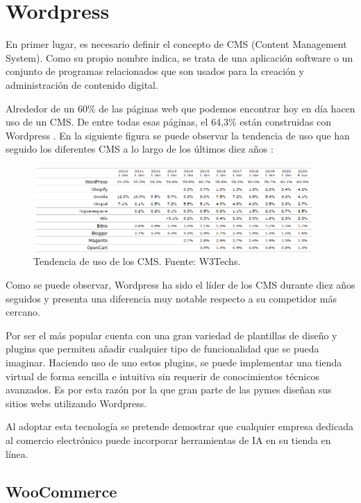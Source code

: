 \section{Wordpress}
En primer lugar, es necesario definir el concepto de CMS (Content Management System). Como su propio nombre indica, se trata de una aplicación software o un conjunto de programas relacionados que son usados para la creación y administración de contenido digital. 

Alrededor de un 60\% de las páginas web que podemos encontrar hoy en día hacen uso de un CMS. De entre todas esas páginas, el 64,3\% están construidas con Wordpress . En la siguiente figura se puede observar la tendencia de uso que han seguido los diferentes CMS a lo largo de los últimos diez años : 

\begin{figure}[ht]
	\begin{center}
		\includegraphics[width = 0.95\textwidth]{Figuras/TendenciaUsoCMS.PNG}
	\end{center}
	\caption{\label{fig:CMS} Tendencia de uso de los CMS. Fuente: W3Techs.}
\end{figure}

Como se puede observar, Wordpress ha sido el líder de los CMS durante diez años seguidos y presenta una diferencia muy notable respecto a su competidor más cercano.

Por ser el más popular cuenta con una gran variedad de plantillas de diseño y plugins que permiten añadir cualquier tipo de funcionalidad que se pueda imaginar. Haciendo uso de uno estos plugins, se puede implementar una tienda virtual de forma sencilla e intuitiva sin requerir de conocimientos técnicos avanzados. Es por esta razón por la que gran parte de las pymes diseñan sus sitios webs utilizando Wordpress.

Al adoptar esta tecnología se pretende demostrar que cualquier empresa dedicada al comercio electrónico puede incorporar herramientas de IA en su tienda en línea.

\newpage

\subsection{WooCommerce}

